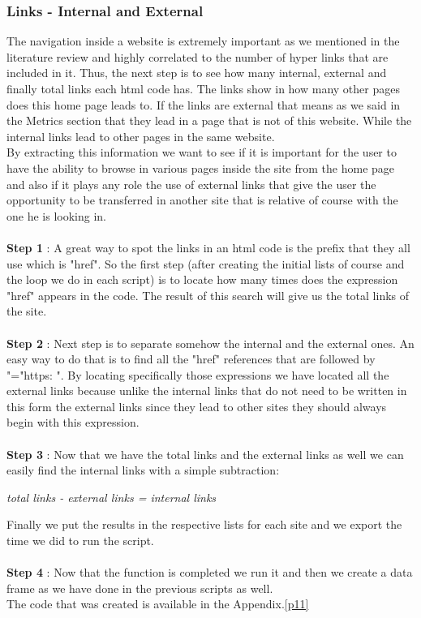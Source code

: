 \documentclass{article}
\begin{document}
\subsubsection{Links - Internal and External}
The navigation inside a website is extremely important as we mentioned in the literature review and highly correlated to the number of hyper links that are included in it. Thus, the next step is to see how many internal, external and finally total links each html code has. The links show in how many other pages does this home page leads to. If the links are external that means as we said in the Metrics section that they lead in a page that is not of this website. While the internal links lead to other pages in the same website.\\
By extracting this information we want to see if it is important for the user to have the ability to browse in various pages inside the site from the home page and also if it plays any role the use of external links that give the user the opportunity to be transferred in another site that is relative of course with the one he is looking in.\\\\
\textbf{Step 1} : A great way to spot the links in an html code is the prefix that they all use which is "href". So the first step (after creating the initial lists of course and the loop we do in each script) is to locate how many times does the expression "href" appears in the code. The result of this search will give us the total links of the site.\\\\
\textbf{Step 2} : Next step is to separate somehow the internal and the external ones. An easy way to do that is to find all the "href" references that are followed by "="https: ". By locating specifically those expressions we have located all the external links because unlike the internal links that do not need to be written in this form the external links since they lead to other sites they should always begin with this expression.\\\\
\textbf{Step 3} : Now that we have the total links and the external links as well we can easily find the internal links with a simple subtraction:
\begin{center}
\textit{total links - external links = internal links}
\end{center}
Finally we put the results in the respective lists for each site and we export the time we did to run the script.\\\\
\textbf{Step 4} : Now that the function is completed we run it and then we create a data frame as we have done in the previous scripts as well.\\
The code that was created is available in the Appendix.\ref{p11}
\end{document}
